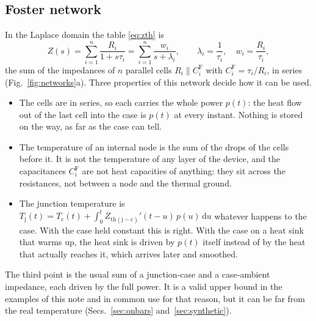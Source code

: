 \documentclass[10pt,a4paper]{scrartcl}
\newcommand{\Zjc}{Z_\mathrm{th(j-c)}}
\newcommand{\Tj}{T_\mathrm{j}}
\newcommand{\Tc}{T_\mathrm{c}}
\newcommand{\diff}{\mathrm{d}}
\begin{document}
\subsection{Foster network}
In the Laplace domain the table \eqref{eq:zth} is
\begin{equation}
Z(s) = \sum_{i=1}^{n} \frac{R_i}{1 + s\tau_i} = \sum_{i=1}^{n} \frac{w_i}{s + \lambda_i} , \qquad \lambda_i = \frac{1}{\tau_i} , \quad w_i = \frac{R_i}{\tau_i} ,
\label{eq:zfoster}
\end{equation}
the sum of the impedances of $n$ parallel cells $R_i \parallel C_i^\mathrm{F}$ with $C_i^\mathrm{F} = \tau_i/R_i$, in series (Fig.~\ref{fig:networks}a). Three properties of this network decide how it can be used.
\begin{itemize}
\item The cells are in series, so each carries the whole power $p(t)$: the heat flow out of the last cell into the case is $p(t)$ at every instant. Nothing is stored on the way, as far as the case can tell.
\item The temperature of an internal node is the sum of the drops of the cells before it. It is not the temperature of any layer of the device, and the capacitances $C_i^\mathrm{F}$ are not heat capacities of anything: they sit across the resistances, not between a node and the thermal ground.
\item The junction temperature is $\Tj(t) = \Tc(t) + \int_0^t \Zjc'(t-u)\,p(u)\,\diff u$ whatever happens to the case. With the case held constant this is right. With the case on a heat sink that warms up, the heat sink is driven by $p(t)$ itself instead of by the heat that actually reaches it, which arrives later and smoothed.
\end{itemize}
The third point is the usual sum of a junction-case and a case-ambient impedance, each driven by the full power. It is a valid upper bound in the examples of this note and in common use for that reason, but it can be far from the real temperature (Secs.~\ref{sec:onbars} and~\ref{sec:synthetic}).
\end{document}
